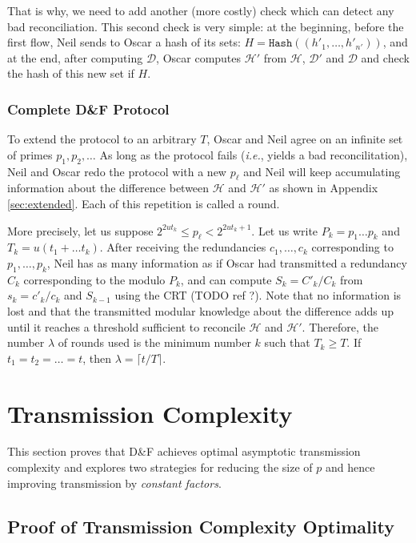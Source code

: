 \documentclass[11pt]{llncs}
\newcommand{\Set}{\mathcal{H}}
\newcommand{\SetD}{\mathcal{D}}
\newcommand{\ie}{\textit{i.e.}}
\newcommand{\Hash}{\texttt{Hash}\xspace}
\begin{document}
That is why, we need to add another (more costly) check which can detect any bad reconciliation.
This second check is very simple: at the beginning, before the first flow, Neil sends to Oscar a hash of its sets: $H = \Hash((h'_1,\dots,h'_{n'}))$, and at the end, after computing $\SetD$, Oscar computes $\Set'$ from $\Set$, $\SetD'$ and $\SetD$ and check the hash of this new set if $H$.

\subsubsection{Complete D\&F Protocol}
To extend the protocol to an arbitrary $T$, Oscar and Neil agree on an infinite set of primes $p_1,p_2,\ldots$ As long as the protocol fails (\ie, yields a bad reconcilitation), Neil and Oscar redo the protocol with a new $p_\ell$ and Neil will keep accumulating information about the difference between $\Set$ and $\Set'$ as shown in Appendix \ref{sec:extended}. 
Each of this repetition is called a round.


More precisely, let us suppose $2^{2 u t_k} \le p_\ell < 2^{2 u t_k +1}$.
Let us write $P_k = p_1 \dots p_k$ and $T_k = u (t_1 + \dots t_k)$.
After receiving the redundancies $c_1,\dots,c_k$ corresponding to $p_1,\dots,p_k$, Neil has as many information as if Oscar had transmitted a redundancy $C_k$ corresponding to the modulo $P_k$, and can compute $S_k = C'_k / C_k$ from $s_k = c'_k/c_k$ and $S_{k-1}$ using the CRT (TODO ref ?).
Note that no information is lost and that the transmitted modular knowledge about the difference adds up until it reaches a threshold sufficient to reconcile $\Set$ and $\Set'$.
Therefore, the number $\lambda$ of rounds used is the minimum number $k$ such that $T_k \ge T$.
If $t_1 = t_2 = \dots = t$, then $\lambda = \lceil t/T \rceil$.


\section{Transmission Complexity}
\label{trans}

This section proves that D\&F achieves optimal asymptotic transmission complexity and explores two strategies for reducing the size of $p$ and hence improving transmission by {\sl constant factors}.

\subsection{Proof of Transmission Complexity Optimality}
\end{document}
